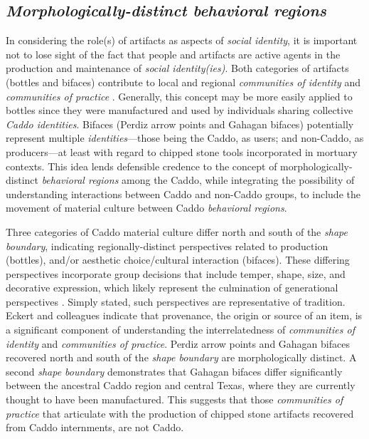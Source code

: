 \documentclass[smallextended]{svjour3}       %
\begin{document}
\hypertarget{morphologically-distinct-behavioral-regions}{%
\subsection{\texorpdfstring{\emph{Morphologically-distinct behavioral
regions}}{Morphologically-distinct behavioral regions}}\label{morphologically-distinct-behavioral-regions}}

In considering the role(s) of artifacts as aspects of \emph{social
identity}, it is important not to lose sight of the fact that people and
artifacts are active agents in the production and maintenance of
\emph{social identity(ies)}. Both categories of artifacts (bottles and
bifaces) contribute to local and regional \emph{communities of identity}
and \emph{communities of practice} \cite{RN8061}. Generally, this
concept may be more easily applied to bottles since they were
manufactured and used by individuals sharing collective \emph{Caddo
identities}. Bifaces (Perdiz arrow points and Gahagan bifaces)
potentially represent multiple \emph{identities}---those being the
Caddo, as users; and non-Caddo, as producers---at least with regard to
chipped stone tools incorporated in mortuary contexts. This idea lends
defensible credence to the concept of morphologically-distinct
\emph{behavioral regions} among the Caddo, while integrating the
possibility of understanding interactions between Caddo and non-Caddo
groups, to include the movement of material culture between Caddo
\emph{behavioral regions}.

Three categories of Caddo material culture differ north and south of the
\emph{shape boundary}, indicating regionally-distinct perspectives
related to production (bottles), and/or aesthetic choice/cultural
interaction (bifaces). These differing perspectives incorporate group
decisions that include temper, shape, size, and decorative expression,
which likely represent the culmination of generational perspectives
\cite{RN5610}. Simply stated, such perspectives are representative of
tradition. Eckert and colleagues \cite{RN8061} indicate that provenance,
the origin or source of an item, is a significant component of
understanding the interrelatedness of \emph{communities of identity} and
\emph{communities of practice}. Perdiz arrow points and Gahagan bifaces
recovered north and south of the \emph{shape boundary} are
morphologically distinct. A second \emph{shape boundary} demonstrates
that Gahagan bifaces differ significantly between the ancestral Caddo
region and central Texas, where they are currently thought to have been
manufactured. This suggests that those \emph{communities of practice}
that articulate with the production of chipped stone artifacts recovered
from Caddo internments, are not Caddo.
\end{document}
